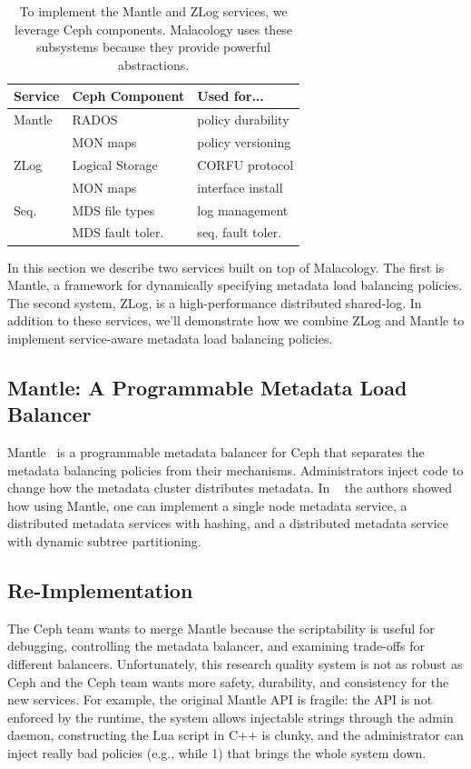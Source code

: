 \documentclass[10pt,twocolumn]{article}
\begin{document}
\begin{table}
\centering
\begin{tabular}{  l | l | l    }
\textbf{Service} & \textbf{Ceph Component} & \textbf{Used for...}  \\ \hline
Mantle  & RADOS    & policy durability \\
        & MON maps & policy versioning \\ \hline
ZLog    & Logical Storage & CORFU protocol  \\ 
        & MON maps & interface install \\ \hline
Seq.    & MDS file types & log management \\ 
        & MDS fault toler. & seq. fault toler. \\
\end{tabular}
\caption{To implement the Mantle and ZLog services, we leverage Ceph components. Malacology uses these subsystems because they provide powerful abstractions.}
\label{table:implementation}
\end{table}

In this section we describe two services built on top of Malacology. The first
is Mantle, a framework for dynamically specifying metadata load balancing
policies. The second system, ZLog, is a high-performance distributed shared-log.
In addition to these services, we'll demonstrate how we combine ZLog and Mantle
to implement service-aware metadata load balancing policies.

\subsection{Mantle: A Programmable Metadata Load Balancer}
\label{sec:mantle}

Mantle~\cite{sevilla:sc15-mantle} is a programmable metadata
balancer for Ceph that separates the metadata balancing policies from their
mechanisms. Administrators inject code to change how the metadata cluster
distributes metadata. In ~\cite{sevilla:sc15-mantle} the authors showed how 
using Mantle, one can implement a single node metadata service, a distributed 
metadata services with hashing, and a distributed metadata service with dynamic 
subtree partitioning.

\subsection{Re-Implementation}

The Ceph team wants to merge Mantle because the scriptability is useful
for debugging, controlling the metadata balancer, and examining
trade-offs for different balancers. Unfortunately, this research quality
system is not as robust as Ceph and the Ceph team wants more safety,
durability, and consistency for the new services. For example, the
original Mantle API is fragile: the API is not enforced by the runtime,
the system allows injectable strings through the admin daemon,
constructing the Lua script in C++ is clunky, and the administrator can
inject really bad policies (e.g., while 1) that brings the whole system
down.
\end{document}
